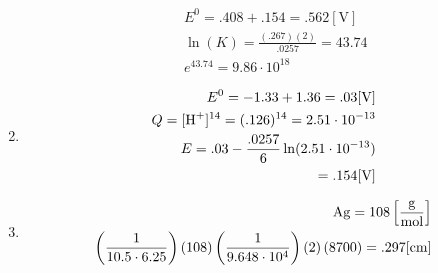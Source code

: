 \documentclass[12pt]{article}
\begin{document}
\begin{enumerate}
\begin{enumerate}
        \begin{equation}
          \begin{split}
            E^0=.408+.154=.562[\si{\volt}]\\
            \ln(K)=\frac{(.267)(2)}{.0257}=43.74\\
            e^{43.74}=9.86\cdot10^{18}
          \end{split}
          \label{4}
        \end{equation}

    \end{enumerate}

  \item

    \begin{equation}
      \begin{split}
        E^0=-1.33+1.36=.03[\si{\volt}]\\
        Q=[\ce{H+}]^{14}=(.126)^{14}=2.51\cdot10^{-13}\\
        E=.03-\frac{.0257}{6}\ln(2.51\cdot10^{-13})\\
        =.154[\si{\volt}]
      \end{split}
      \label{5}
    \end{equation}

  \item

    \begin{equation}
      \begin{split}
        \ce{Ag}=108\left[ \frac{\si{\gram}}{\si{\mole}} \right]\\
        \left( \frac{1}{10.5\cdot6.25} \right)\left( 108  \right)\left( \frac{1}{9.648\cdot10^4} \right)\left( 2 \right)(8700)=.297[\si{\centi\meter}]
      \end{split}
      \label{6}
    \end{equation}

\end{enumerate}
\end{document}

